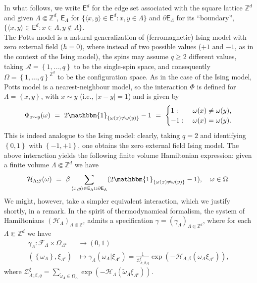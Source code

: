 \documentclass[12pt]{article}
\newcommand{\A}{\mathcal{A}}
\newcommand{\E}{\mathsf{E}}
\newcommand{\F}{\mathcal{F}}
\renewcommand{\H}{\mathcal{H}}
\newcommand{\Z}{\mathbb{Z}}
\newcommand{\ZZ}{\mathcal{Z}}
\newcommand{\set}[1]{\left\{#1\right\}}
\newcommand{\oklepaj}[1]{\left(#1\right)}
\newcommand{\ra}{\rightarrow}
\newcommand{\1}{\mathbbm{1}}
\renewcommand{\sp}[1]{\langle #1\rangle}
\renewcommand{\c}{\mathsf{c}}
\newcommand{\5}{\vspace{0.5cm}}
\renewcommand{\tilde}{\widetilde}
\theoremstyle{definition}
\begin{document}
In what follows, we write $\E^d$ for the edge set associated with the square lattice $\Z^d$ and given $\Lambda\Subset\Z^d$, $\E_\Lambda$ for $\{\sp{x,y}\in\E^d:x,y\in\Lambda\}$ and $\partial\E_\Lambda$ for its ``boundary'', $\{\sp{x,y}\in\E^d:x\in\Lambda,y\notin\Lambda\}$. \\

The Potts model is a natural generalization of (ferromagnetic) Ising model with zero external field ($h=0$), where instead of two possible values ($+1$ and $-1$, as in the context of the Ising model), the spins may assume $q\geq 2$ different values, taking $\A=\set{1,\ldots,q}$ to be the single-spin space, and consequently $\Omega=\set{1,\ldots,q}^{\Z^d}$ to be the configuration space. As in the case of the Ising model, Potts model is a nearest-neighbour model, so the interaction $\Phi$ is defined for $\Lambda=\set{x,y}$, with $x\sim y$ (i.e., $|x-y|=1$) and is given by
$$\Phi_{x\sim y}(\omega) ~=~ 2\1_{\set{\omega(x)\neq \omega(y)}}-1 ~=~ \begin{cases}
1: ~&\omega(x)\neq\omega(y), \\
-1: ~&\omega(x)=\omega(y).
\end{cases}$$
This is indeed analogue to the Ising model: clearly, taking $q=2$ and identifying $\set{0,1}$ with $\set{-1,+1}$, one obtains the zero external field Ising model. The above interaction yields the following finite volume Hamiltonian expression: given a finite volume $\Lambda\Subset\Z^d$ we have
$$\H_{\Lambda;\beta}(\omega) ~=~ \beta\sum_{\sp{x,y}\in\E_\Lambda\cup\partial\E_\Lambda}(2\1_{\set{\omega(x)\neq\omega(y)}}-1), \quad \omega\in\Omega.$$
We might, however, take a simpler equivalent interaction, which we justify shortly, in a remark. In the spirit of thermodynamical formalism, the system of Hamiltonians $(\H_\Lambda)_{\Lambda\Subset\Z^d}$ admits a specification $\gamma=(\gamma_\Lambda)_{\Lambda\Subset\Z^d}$, where for each $\Lambda\Subset\Z^d$ we have
\begin{align*}
\gamma_\Lambda:\F_\Lambda\times\Omega_{\Lambda^\c}&\ra (0,1) \\
(\set{\omega_{\Lambda}},\xi_{\Lambda^\c})&\mapsto\gamma_{\Lambda}(\omega_{\Lambda}|\xi_{\Lambda^\c})=\frac{1}{\ZZ_{\Lambda;\beta,q}^\xi}\exp\!\oklepaj{-\H_{\Lambda;\beta}(\omega_\Lambda\xi_{\Lambda^\c})},
\end{align*}
where $\ZZ_{\Lambda;\beta,q}^\xi=\sum_{\tilde{\omega}_\Lambda\in\Omega_\Lambda}\exp\!\oklepaj{-\H_\Lambda(\tilde{\omega}_{\Lambda}\xi_{\Lambda^\c})}$.
\end{document}

